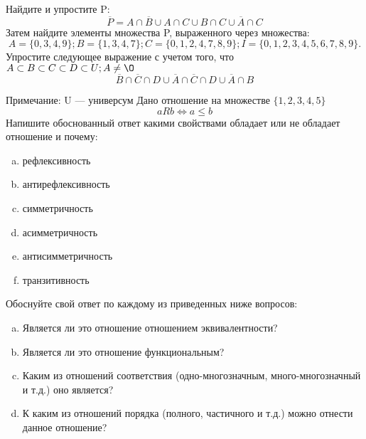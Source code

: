 \documentclass[10pt]{exam}
\begin{document}
\begin{questions}
\question
Найдите и упростите P:
\begin{equation*}
\overline{P} = A \cap \overline{B} \cup A \cap C \cup B \cap C \cup \overline{A} \cap C
\end{equation*}
Затем найдите элементы множества P, выраженного через множества:
\begin{equation*}
A = \{0, 3, 4, 9\}; 
B = \{1, 3, 4, 7\};
C = \{0, 1, 2, 4, 7, 8, 9\};
I = \{0, 1, 2, 3, 4, 5, 6, 7, 8, 9\}.
\end{equation*}\question
Упростите следующее выражение с учетом того, что $A\subset B \subset C \subset D \subset U; A \neq \O$
\begin{equation*}
\overline{B} \cap \overline{C} \cap D \cup \overline{A} \cap \overline{C} \cap D \cup \overline{A} \cap B
\end{equation*}

Примечание: U — универсум\question
Дано отношение на множестве $\{1, 2, 3, 4, 5\}$ 
\begin{equation*}
aRb \iff a \leq b
\end{equation*}
Напишите обоснованный ответ какими свойствами обладает или не обладает отношение и почему:   
\begin{enumerate} [a)]\setcounter{enumi}{0}
\item рефлексивность
\item антирефлексивность
\item симметричность
\item асимметричность
\item антисимметричность
\item транзитивность
\end{enumerate}

Обоснуйте свой ответ по каждому из приведенных ниже вопросов:
\begin{enumerate} [a)]\setcounter{enumi}{0}
    \item Является ли это отношение отношением эквивалентности?
    \item Является ли это отношение функциональным?
    \item Каким из отношений соответствия (одно-многозначным, много-многозначный и т.д.) оно является?
    \item К каким из отношений порядка (полного, частичного и т.д.) можно отнести данное отношение?
\end{enumerate}



\end{questions}
\end{document}
